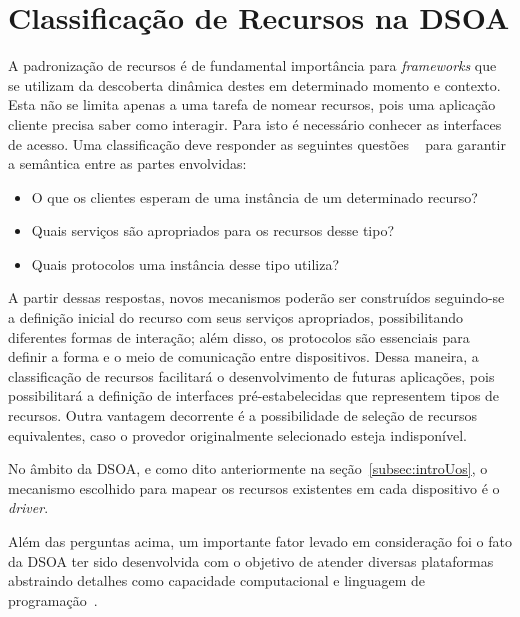 \chapter{Classificação de Recursos na DSOA}
\label{cap:proposta}

A padronização de recursos é de fundamental importância para \emph{frameworks} que se utilizam da descoberta dinâmica destes em determinado momento e contexto. Esta não se limita apenas a uma tarefa de nomear recursos, pois uma aplicação cliente precisa saber como interagir. Para isto é necessário conhecer as interfaces de acesso. Uma classificação deve responder as seguintes questões ~\cite{pervasiveComputing} para garantir a semântica entre as partes envolvidas:

\begin{itemize}
	\item O que os clientes esperam de uma instância de um determinado recurso?

	\item Quais serviços são apropriados para os recursos desse tipo?

	\item Quais protocolos uma instância desse tipo utiliza?
\end{itemize}

A partir dessas respostas, novos mecanismos poderão ser construídos seguindo-se a definição inicial do recurso com seus serviços apropriados, possibilitando diferentes formas de interação; além disso, os protocolos são essenciais para definir a forma e o meio de comunicação entre dispositivos. Dessa maneira, a classificação de recursos facilitará o desenvolvimento de futuras aplicações, pois possibilitará a definição de interfaces pré-estabelecidas que representem tipos de recursos. Outra vantagem decorrente é a possibilidade de seleção de recursos equivalentes, caso o provedor originalmente selecionado esteja indisponível.

No âmbito da DSOA, e como dito anteriormente na seção~\ref{subsec:introUos}, o mecanismo escolhido para mapear os recursos existentes em cada dispositivo é o \emph{driver}.

 Além das perguntas acima, um importante fator levado em consideração foi o fato da DSOA ter sido desenvolvida com o objetivo de atender diversas plataformas abstraindo detalhes como capacidade computacional e linguagem de programação~\cite{buzetoDSOA2010}.

